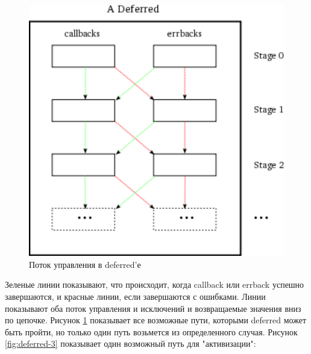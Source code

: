 \begin{figure}[h]
\begin{center}
    \includegraphics[height=0.3\textheight]{images/deferred-2.pdf}
    \caption{Поток управления в deferred'е\label{fig:deferred-2}}
\end{center}
\end{figure}


Зеленые линии показывают, что происходит, когда 
callback или errback успешно завершаются, и 
красные линии, если завершаются с ошибками. 
Линии показывают оба поток управления и исключений и 
возвращаемые значения вниз по цепочке. Рисунок \ref{fig:deferred-2} 
показывает все возможные пути, которыми deferred 
может быть пройти, но только один путь возьмется из определенного 
случая. Рисунок \ref{fig:deferred-3} показывает один 
возможный путь для "активизации": 

